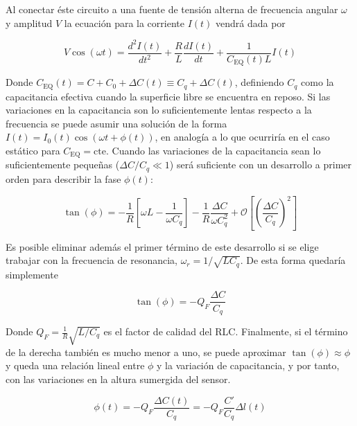 
Al conectar éste circuito a una fuente de tensión alterna de frecuencia angular $\omega$ y amplitud $V$ la ecuación para la corriente $I(t)$ vendrá dada por %

\begin{equation}
	V \cos(\omega t) = \frac{d^2I(t)}{dt^2} + \frac{R}{L} \frac{dI(t)}{dt} + \frac{1}{C_{\text{EQ}}(t)L} I(t)  
	\label{eq:circuit_eq}
\end{equation}

Donde $C_{\text{EQ}}(t) = C + C_0 + \Delta C(t)\equiv C_q + \Delta C(t)$, definiendo $C_q$ como la capacitancia efectiva cuando la superficie libre se encuentra en reposo. Si las variaciones en la capacitancia son lo suficientemente lentas respecto a la frecuencia se puede asumir una solución de la forma $I(t)=I_0(t)\cos(\omega t + \phi(t))$, en analogía a lo que ocurriría en el caso estático para $C_{\text{EQ}}=\text{cte}$.  Cuando las variaciones de la capacitancia sean lo suficientemente pequeñas ($\Delta C/C_q\ll 1$) será suficiente con  un desarrollo a primer orden para describir la fase $\phi(t)$:      %

\begin{equation}
	\tan(\phi) = -\frac{1}{R} \left[\omega L - \frac{1}{\omega C_q}\right] - \frac{1}{R} \frac{\Delta C}{\omega C_q^2} + \mathcal{O}\left[\left(\frac{\Delta C}{C_q}\right)^2\right] 
\end{equation}

Es posible eliminar además el primer término de este desarrollo si se elige trabajar con la frecuencia de resonancia, $\omega_r=1/\sqrt{LC_q}$. De esta forma quedaría simplemente 

\begin{equation}
	\tan(\phi) = -Q_F \frac{\Delta C}{C_q} 
\end{equation}

Donde $Q_F=\frac{1}{R}\sqrt{L/C_q}$ es el factor de calidad del RLC. Finalmente, si el término de la derecha también es mucho menor a uno, se puede aproximar $\tan(\phi)\approx\phi$ y queda una relación lineal entre $\phi$ y la variación de capacitancia, y por tanto, con las variaciones en la altura sumergida del sensor. 

\begin{equation}
	\phi(t) = -Q_{F} \frac{\Delta C(t)}{C_q} = -Q_{F}\frac{C'}{C_q} \Delta l(t) 
	\label{eq:relación_lineal}
\end{equation} 

